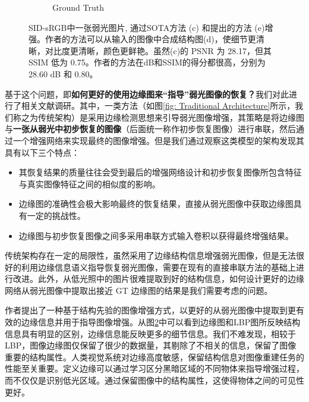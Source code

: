 \documentclass[a4paper, 10pt]{article}
\begin{document}
\begin{figure}[htb]
\begin{subfigure}{0.25\columnwidth}
			\captionsetup{font=scriptsize}
			\caption{Ground Truth}
			\label{fig: Ground Truth}
		\end{subfigure}
		\caption{
			\label{fig: Structural Information}
			SID-sRGB\cite{chen2018learning}中一张弱光图片, 通过SOTA方法 (c) 和\cite{xu2023low}提出的方法 (e)增强。作者的方法可以从输入的图像中合成结构图(d)，使细节更清晰，对比度更清晰，颜色更鲜艳。虽然(c)的 PSNR 为 28.17，但其 SSIM 低为 0.75。作者的方法在dB和SSIM\cite{wang2004image}的得分都很高，分别为28.60 dB 和 0.80。
		}
	\end{figure}
	
	基于这个问题，即\textbf{如何更好的使用边缘图来“指导”弱光图像的恢复？}我们对此进行了相关文献调研。其中，一类方法（如图\ref{fig: Traditional Architecture}所示，我们称之为传统架构）是采用边缘检测思想来引导弱光图像增强，其策略是将边缘图与\textbf{一张从弱光中初步恢复的图像}（后面统一称作初步恢复图像）进行串联，然后通过一个增强网络来实现最终的图像增强\cite{zhu2020eemefn, rana2021edge}。但是我们通过观察这类模型的架构发现其具有以下三个特点：
	
	\begin{itemize}
		\item [(1)] 其恢复结果的质量往往会受到最后的增强网络设计和初步恢复图像所包含特征与真实图像特征之间的相似度的影响。
		
		\item [(2)] 边缘图的准确性会极大影响最终的恢复结果，直接从弱光图像中获取边缘图具有一定的挑战性。
		
		\item [(3)] 边缘图与初步恢复图像之间多采用串联方式输入卷积以获得最终增强结果。
	\end{itemize}
	
	传统架构存在一定的局限性，虽然采用了边缘结构信息增强弱光图像，但是无法很好的利用边缘信息语义指导恢复弱光图像，需要在现有的直接串联方法的基础上进行改进。此外，从低光照中的图片很难提取到好的结构信息，如何设计更好的边缘网络从弱光图像中提取出接近 GT 边缘图的结果是我们需要考虑的问题。
	
	作者\cite{xu2023low}提出了一种基于结构先验的图像增强方式，以更好的从弱光图像中提取到更有效的边缘信息并用于指导图像增强。从图\ref{fig: Structural Information}中可以看到边缘图和LBP图\cite{pietikainen2010local}所反映结构信息具有明显的区别，边缘信息能反映更多的细节信息。我们不难发现，相较于LBP，图像边缘图仅保留了很少的数据量，其剔除了不相关的信息，保留了图像重要的结构属性。人类视觉系统对边缘高度敏感，保留结构信息对图像重建任务的性能至关重要。定义边缘可以通过学习区分黑暗区域的不同物体来指导增强过程，而不仅仅是识别低光区域。通过保留图像中的结构属性，这使得物体之间的可见性更好。
	
\end{document}
